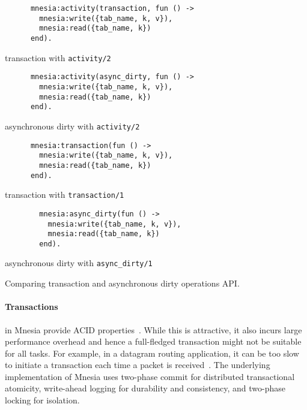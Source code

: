 \begin{listing}[htp]
  \begin{sublisting}{0.46\linewidth}
    \begin{verbatim}
      mnesia:activity(transaction, fun () -> 
        mnesia:write({tab_name, k, v}),
        mnesia:read({tab_name, k})
      end).
    \end{verbatim}
    \caption{transaction with \texttt{activity/2}}
  \end{sublisting}
  \hfill
  \begin{sublisting}{0.46\linewidth}
    \begin{verbatim}
      mnesia:activity(async_dirty, fun () -> 
        mnesia:write({tab_name, k, v}),
        mnesia:read({tab_name, k})
      end).
    \end{verbatim}
    \caption{asynchronous dirty with \texttt{activity/2}}
  \end{sublisting}
  \begin{sublisting}{0.46\linewidth}
    \begin{verbatim}
      mnesia:transaction(fun () -> 
        mnesia:write({tab_name, k, v}),
        mnesia:read({tab_name, k})
      end).
    \end{verbatim}
    \caption{transaction with \texttt{transaction/1}}
  \end{sublisting}
  \hfill
  \begin{sublisting}{0.46\linewidth}
      \begin{verbatim}
        mnesia:async_dirty(fun () -> 
          mnesia:write({tab_name, k, v}),
          mnesia:read({tab_name, k})
        end).
      \end{verbatim}
    \caption{asynchronous dirty with \texttt{async\_dirty/1}}
    \label{sublst:async dirty write}
  \end{sublisting}
  \caption{Comparing transaction and asynchronous dirty operations API.}
  \label{lst:dirty trans api}
\end{listing}


\paragraph{Transactions} in Mnesia provide ACID properties~\cite{ericssonab2023mnesiaguide}.
While this is attractive, it also incurs large performance overhead 
and hence a full-fledged transaction might not be suitable for all tasks.
For example, in a datagram routing application, it can be too slow to initiate
a transaction each time a packet is received~\cite{ericssonab2023mnesiaguide}.
The underlying implementation of Mnesia uses two-phase commit
for distributed transactional atomicity, write-ahead logging for durability and consistency, 
and two-phase locking for isolation.



